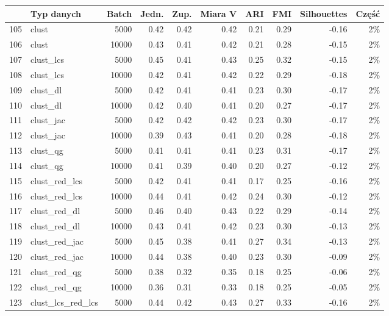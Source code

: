 \documentclass{praca1}
\begin{document}
\begin{table}[!h]
\centering
\begin{tabular}{|rlr|rrr|rr|r|r|}
  \hline
 & Typ danych & Batch & Jedn. & Zup. & Miara V & ARI & FMI & Silhouettes & Część \\ 
  \hline
105 & clust & 5000 & 0.42 & 0.42 & 0.42 & 0.21 & 0.29 & -0.16 & 2\% \\ 
  106 & clust & 10000 & 0.43 & 0.41 & 0.42 & 0.21 & 0.28 & -0.15 & 2\% \\ 
   \hline
107 & clust\_lcs & 5000 & 0.45 & 0.41 & 0.43 & 0.25 & 0.32 & -0.15 & 2\% \\ 
  108 & clust\_lcs & 10000 & 0.42 & 0.41 & 0.42 & 0.22 & 0.29 & -0.18 & 2\% \\ 
   \hline
109 & clust\_dl & 5000 & 0.42 & 0.41 & 0.41 & 0.23 & 0.30 & -0.17 & 2\% \\ 
  110 & clust\_dl & 10000 & 0.42 & 0.40 & 0.41 & 0.20 & 0.27 & -0.17 & 2\% \\ 
   \hline
111 & clust\_jac & 5000 & 0.42 & 0.42 & 0.42 & 0.23 & 0.30 & -0.17 & 2\% \\ 
  112 & clust\_jac & 10000 & 0.39 & 0.43 & 0.41 & 0.20 & 0.28 & -0.18 & 2\% \\ 
   \hline
113 & clust\_qg & 5000 & 0.41 & 0.41 & 0.41 & 0.23 & 0.31 & -0.17 & 2\% \\ 
  114 & clust\_qg & 10000 & 0.41 & 0.39 & 0.40 & 0.20 & 0.27 & -0.12 & 2\% \\ 
   \hline
115 & clust\_red\_lcs & 5000 & 0.42 & 0.41 & 0.41 & 0.17 & 0.25 & -0.16 & 2\% \\ 
  116 & clust\_red\_lcs & 10000 & 0.44 & 0.41 & 0.42 & 0.24 & 0.30 & -0.12 & 2\% \\ 
   \hline
117 & clust\_red\_dl & 5000 & 0.46 & 0.40 & 0.43 & 0.22 & 0.29 & -0.14 & 2\% \\ 
  118 & clust\_red\_dl & 10000 & 0.43 & 0.41 & 0.42 & 0.23 & 0.30 & -0.13 & 2\% \\ 
   \hline
119 & clust\_red\_jac & 5000 & 0.45 & 0.38 & 0.41 & 0.27 & 0.34 & -0.13 & 2\% \\ 
  120 & clust\_red\_jac & 10000 & 0.44 & 0.38 & 0.40 & 0.23 & 0.30 & -0.09 & 2\% \\ 
   \hline
121 & clust\_red\_qg & 5000 & 0.38 & 0.32 & 0.35 & 0.18 & 0.25 & -0.06 & 2\% \\ 
  122 & clust\_red\_qg & 10000 & 0.36 & 0.31 & 0.33 & 0.18 & 0.25 & -0.05 & 2\% \\ 
   \hline
123 & clust\_lcs\_red\_lcs & 5000 & 0.44 & 0.42 & 0.43 & 0.27 & 0.33 & -0.16 & 2\% \\ 

\end{tabular}
\end{table}
\end{document}
